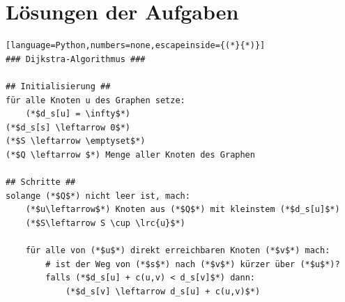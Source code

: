 





















\clearpage
\section{Lösungen der Aufgaben}






\clearpage
\begin{lstlisting}[language=Python,numbers=none,escapeinside={(*}{*)}]
### Dijkstra-Algorithmus ###

## Initialisierung ##
für alle Knoten u des Graphen setze:
    (*$d_s[u] = \infty$*)
(*$d_s[s] \leftarrow 0$*)
(*$S \leftarrow \emptyset$*)
(*$Q \leftarrow $*) Menge aller Knoten des Graphen

## Schritte ##
solange (*$Q$*) nicht leer ist, mach:
    (*$u\leftarrow$*) Knoten aus (*$Q$*) mit kleinstem (*$d_s[u]$*)
    (*$S\leftarrow S \cup \lrc{u}$*)

    für alle von (*$u$*) direkt erreichbaren Knoten (*$v$*) mach:
        # ist der Weg von (*$s$*) nach (*$v$*) kürzer über (*$u$*)?
        falls (*$d_s[u] + c(u,v) < d_s[v]$*) dann:
            (*$d_s[v] \leftarrow d_s[u] + c(u,v)$*)
\end{lstlisting}


\shipoutAnswer

